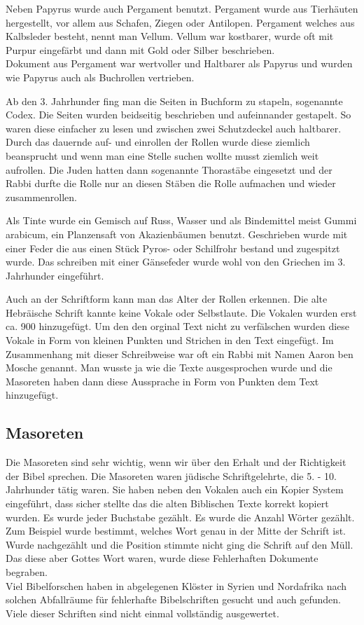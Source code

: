 Neben Papyrus wurde auch Pergament benutzt. Pergament wurde aus Tierhäuten hergestellt, vor allem aus Schafen, Ziegen oder Antilopen. Pergament welches aus Kalbsleder besteht, nennt man Vellum. Vellum war kostbarer, wurde oft mit Purpur eingefärbt und dann mit Gold oder Silber beschrieben.\\
Dokument aus Pergament war wertvoller und Haltbarer als Papyrus und wurden wie Papyrus auch als Buchrollen vertrieben.

Ab den 3. Jahrhunder \nChr{} fing man die Seiten in Buchform zu stapeln, sogenannte Codex. Die Seiten wurden beidseitig beschrieben und aufeinnander gestapelt. So waren diese einfacher zu lesen und zwischen zwei Schutzdeckel auch haltbarer. Durch das dauernde auf- und einrollen der Rollen wurde diese ziemlich beansprucht und wenn man eine Stelle suchen wollte musst ziemlich weit aufrollen. Die Juden hatten dann sogenannte Thorastäbe eingesetzt und der Rabbi durfte die Rolle nur an diesen Stäben die Rolle aufmachen und wieder zusammenrollen.

Als Tinte wurde ein Gemisch auf Russ, Wasser und als Bindemittel meist Gummi arabicum, ein Planzensaft von Akazienbäumen benutzt. Geschrieben wurde mit einer Feder die aus einen Stück Pyros- oder Schilfrohr bestand und zugespitzt wurde. Das schreiben mit einer Gänsefeder wurde wohl von den Griechen im 3. Jahrhunder \vChr{} eingeführt.

Auch an der Schriftform kann man das Alter der Rollen erkennen. Die alte Hebräische Schrift kannte keine Vokale oder Selbstlaute. Die Vokalen wurden erst ca. 900 \nChr{} hinzugefügt. Um den den orginal Text nicht zu verfälschen wurden diese Vokale in Form von kleinen Punkten und Strichen in den Text eingefügt. Im Zusammenhang mit dieser Schreibweise war oft ein Rabbi mit Namen Aaron ben Mosche genannt. Man wusste ja wie die Texte ausgesprochen wurde und die Masoreten haben dann diese Aussprache in Form von Punkten dem Text hinzugefügt.

\subsection{Masoreten}
Die Masoreten sind sehr wichtig, wenn wir über den Erhalt und der Richtigkeit der Bibel sprechen. Die Masoreten waren jüdische Schriftgelehrte, die 5. - 10. Jahrhunder \nChr{} tätig waren. Sie haben neben den Vokalen auch ein Kopier System eingeführt, dass sicher stellte das die alten Biblischen Texte korrekt kopiert wurden. Es wurde jeder Buchstabe gezählt. Es wurde die Anzahl Wörter gezählt. Zum Beispiel wurde bestimmt, welches Wort genau in der Mitte der Schrift ist. Wurde nachgezählt und die Position stimmte nicht ging die Schrift auf den Müll. Das diese aber Gottes Wort waren, wurde diese Fehlerhaften Dokumente begraben.\\
Viel Bibelforschen haben in abgelegenen Klöster in Syrien und Nordafrika nach solchen Abfallräume für fehlerhafte Bibelschriften gesucht und auch gefunden. Viele dieser Schriften sind nicht einmal vollständig ausgewertet.

